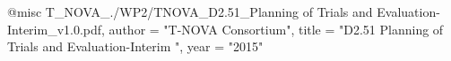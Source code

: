 @misc{ T_NOVA_./WP2/TNOVA_D2.51_Planning of Trials and Evaluation-Interim_v1.0.pdf,
       author = "{T-NOVA Consortium}",
       title = "D2.51 Planning of Trials and Evaluation-Interim ",
       year = "2015" }
